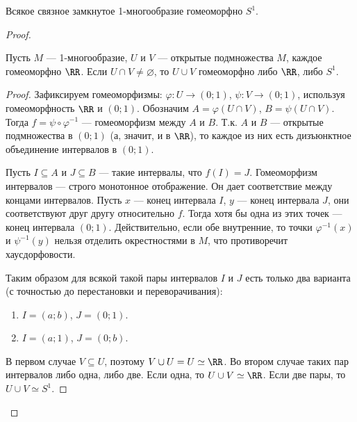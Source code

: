 \documentclass[12pt,a4paper]{article}
\begin{document}
    \begin{theorem}
        Всякое связное замкнутое 1-многообразие гомеоморфно $S^1$.
    \end{theorem}

    \begin{proof}
        \begin{thlemma}
            Пусть $M$ --- 1-многообразие, $U$ и $V$ --- открытые подмножества $M$, каждое гомеоморфно $\RR$. Если $U \cap V \neq \varnothing$, то $U \cup V$ гомеоморфно либо $\RR$, либо $S^1$.
        \end{thlemma}

        \begin{proof}
            Зафиксируем гомеоморфизмы: $\varphi: U \to (0; 1)$, $\psi: V \to (0; 1)$, используя гомеоморфность $\RR$ и $(0; 1)$. Обозначим $A = \varphi(U \cap V)$, $B = \psi(U \cap V)$. Тогда $f = \psi \circ \varphi^{-1}$ --- гомеоморфизм между $A$ и $B$. Т.к. $A$ и $B$ --- открытые подмножества в $(0; 1)$ (а, значит, и в $\RR$), то каждое из них есть дизъюнктное объединение интервалов в $(0; 1)$.
            
            Пусть $I \subseteq A$ и $J \subseteq B$ ---  такие интервалы, что $f(I) = J$. Гомеоморфизм интервалов --- строго монотонное отображение. Он дает соответствие между концами интервалов. Пусть $x$ --- конец интервала $I$, $y$ --- конец интервала $J$, они соответствуют друг другу относительно $f$. Тогда хотя бы одна из этих точек --- конец интервала $(0; 1)$. Действительно, если обе внутренние, то точки $\varphi^{-1}(x)$ и $\psi^{-1}(y)$ нельзя отделить окрестностями в $M$, что противоречит хаусдорфовости.

            Таким образом для всякой такой пары интервалов $I$ и $J$ есть только два варианта (с точностью до перестановки и
            переворачивания):
            \begin{multicols}{2}
                \begin{enumerate}
                    \item $I = (a; b)$, $J = (0; 1)$.
                    \item $I = (a; 1)$, $J = (0; b)$.
                \end{enumerate}
            \end{multicols}
            В первом случае $V \subseteq U$, поэтому $V \cup U = U \simeq \RR$. Во втором случае таких пар интервалов либо одна, либо две. Если одна, то $U \cup V \simeq \RR$. Если две пары, то $U \cup V \simeq S^1$.
        \end{proof}


\end{proof}
\end{document}
